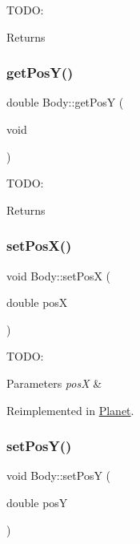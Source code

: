 T\+O\+DO\+: \begin{DoxyReturn}{Returns}

\end{DoxyReturn}
\mbox{\label{class_body_aaa6bdeccdffda065788bf9194fb93a6a}} 
\subsubsection{\texorpdfstring{get\+Pos\+Y()}{getPosY()}}
{\footnotesize\ttfamily double Body\+::get\+PosY (\begin{DoxyParamCaption}\item[{void}]{ }\end{DoxyParamCaption})}

T\+O\+DO\+: \begin{DoxyReturn}{Returns}

\end{DoxyReturn}
\mbox{\label{class_body_a14266f71a12e9ccab50afa62c92f57f6}} 
\subsubsection{\texorpdfstring{set\+Pos\+X()}{setPosX()}}
{\footnotesize\ttfamily void Body\+::set\+PosX (\begin{DoxyParamCaption}\item[{double}]{posX }\end{DoxyParamCaption})\hspace{0.3cm}{\ttfamily [virtual]}}

T\+O\+DO\+: 
\begin{DoxyParams}{Parameters}
{\em posX} & \\
\hline
\end{DoxyParams}


Reimplemented in \hyperlink{class_planet_af7342d2cef15fb89acde2541c2cc678c}{Planet}.

\mbox{\label{class_body_ae2d1b21596116c4d7e863420ea500ac8}} 
\subsubsection{\texorpdfstring{set\+Pos\+Y()}{setPosY()}}
{\footnotesize\ttfamily void Body\+::set\+PosY (\begin{DoxyParamCaption}\item[{double}]{posY }\end{DoxyParamCaption})\hspace{0.3cm}{\ttfamily [virtual]}}


